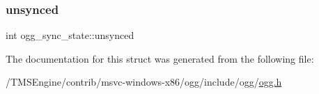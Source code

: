 \mbox{\label{structogg__sync__state_a8d538bb32400470f00080e2160158a76}} 
\subsubsection{\texorpdfstring{unsynced}{unsynced}}
{\footnotesize\ttfamily int ogg\+\_\+sync\+\_\+state\+::unsynced}



The documentation for this struct was generated from the following file\+:\begin{DoxyCompactItemize}
\item 
/\+T\+M\+S\+Engine/contrib/msvc-\/windows-\/x86/ogg/include/ogg/\hyperlink{ogg_8h}{ogg.\+h}\end{DoxyCompactItemize}
